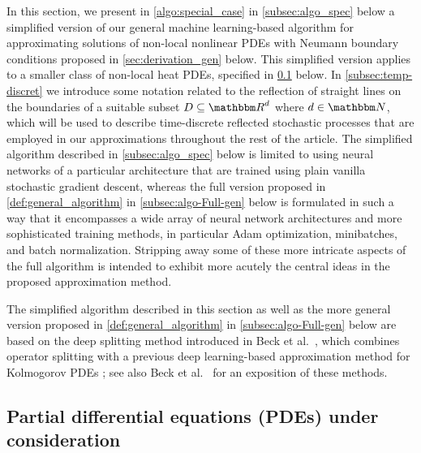 In this section, we present in \cref{algo:special_case} in \cref{subsec:algo_spec} below a simplified version of our general machine learning-based algorithm for approximating solutions of non-local nonlinear PDEs with Neumann boundary conditions proposed in \cref{sec:derivation_gen} below. This simplified version applies to a smaller class of non-local heat PDEs, specified in \cref{subsec:pde_spec} below. In \cref{subsec:temp-discret} we introduce some notation related to the reflection of straight lines on the boundaries of a suitable subset $D\subseteq\R^d$ where $d\in\N$, which will be used to describe time-discrete reflected stochastic processes that are employed in our approximations throughout the rest of the article. The simplified algorithm described in \cref{subsec:algo_spec} below is limited to using neural networks of a particular architecture that are trained using plain vanilla stochastic gradient descent, whereas the full version proposed in \cref{def:general_algorithm} in \cref{subsec:algo-Full-gen} below is formulated in such a way that it encompasses a wide array of neural network architectures and more sophisticated training methods, in particular Adam optimization, minibatches, and batch normalization. Stripping away some of these more intricate aspects of the full algorithm is intended to exhibit more acutely the central ideas in the proposed approximation method.

The simplified algorithm described in this section as well as the more general version proposed in \cref{def:general_algorithm} in \cref{subsec:algo-Full-gen} below are based on the deep splitting method introduced in Beck et al.~\cite{Beck2019}, which combines operator splitting with a previous deep learning-based approximation method for Kolmogorov PDEs \cite{beck2018solving}; see also Beck et al.~\cite[Sections~2 and~3]{Beck2020} for an exposition of these methods.

\subsection{Partial differential equations (PDEs) under consideration}
\label{subsec:pde_spec}


